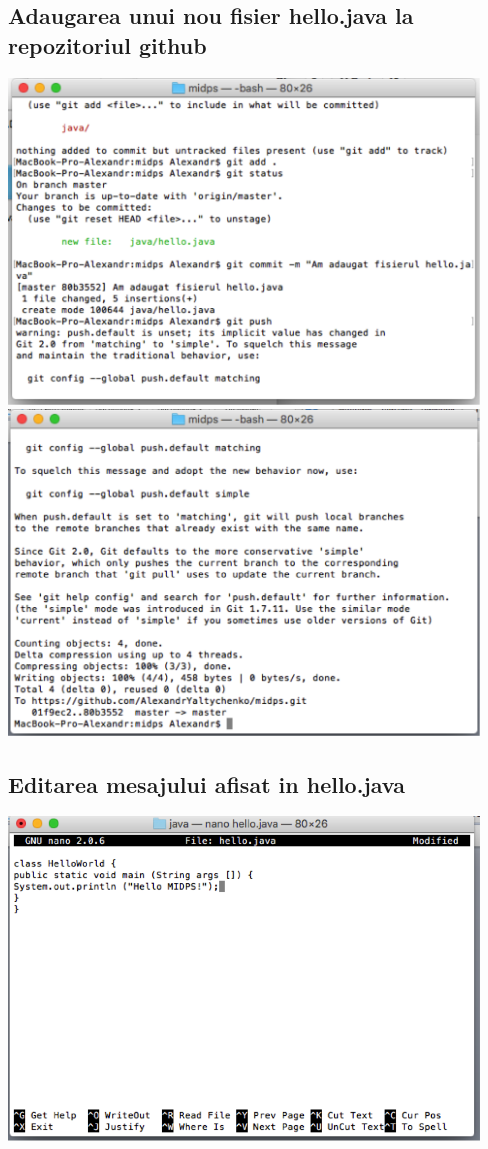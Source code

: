 \documentclass[12pt]{article}
\begin{document}
\subsection{Adaugarea unui nou fisier hello.java la repozitoriul github}
\includegraphics[width=12.5cm]{images/12}\\
\includegraphics[width=12.5cm]{images/13}
\subsection{Editarea mesajului afisat in hello.java}
\includegraphics[width=12.5cm]{images/14}
\end{document}
